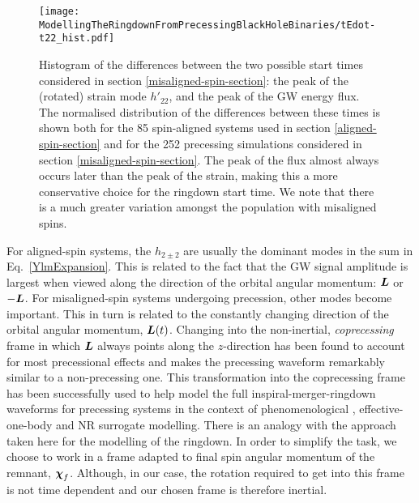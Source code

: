 \begin{figure}[b]
    \centering
    \texttt{[image: ModellingTheRingdownFromPrecessingBlackHoleBinaries/tEdot-t22\_hist.pdf]}
    \caption[Differences between the times of peak strain and peak GW energy flux]{  
    Histogram of the differences between the two possible start times considered in section \ref{misaligned-spin-section}: the peak of the (rotated) strain mode $h'_{22}$, and the peak of the GW energy flux.
    The normalised distribution of the differences between these times is shown both for the 85 spin-aligned systems used in section \ref{aligned-spin-section} and for the 252 precessing simulations considered in section \ref{misaligned-spin-section}. 
    The peak of the flux almost always occurs later than the peak of the strain, making this a more conservative choice for the ringdown start time. 
    We note that there is a much greater variation amongst the population with misaligned spins.
    }
	\label{tEdot-t22}
\end{figure}

For aligned-spin systems, the $h_{2\pm2}$ are usually the dominant modes in the sum in Eq.~\ref{YlmExpansion}. This is related to the fact that the GW signal amplitude is largest when viewed along the direction of the orbital angular momentum: $\vb*{L}$ or $-\vb*{L}$. For misaligned-spin systems undergoing precession, other modes become important. This in turn is related to the constantly changing direction of the orbital angular momentum, $\vb*{L}(t)$.
Changing into the non-inertial, \emph{coprecessing} frame in which $\vb*{L}$ always points along the $z$-direction has been found to account for most precessional effects and makes the precessing waveform remarkably similar to a non-precessing one.
This transformation into the coprecessing frame has been successfully used to help model the full inspiral-merger-ringdown waveforms for precessing systems \cite{Schmidt:2010it,Schmidt:2012rh} in the context of phenomenological \cite{Hannam:2013oca, Khan:2018fmp, Pratten:2020ceb}, effective-one-body \cite{Pan:2013rra, Ossokine:2020kjp} and NR surrogate \cite{Blackman:2017dfb, Blackman:2017pcm, Varma:2019csw} modelling.
There is an analogy with the approach taken here for the modelling of the ringdown. In order to simplify the task, we choose to work in a frame adapted to final spin angular momentum of the remnant, $\vb*{\chi}_f$.
Although, in our case, the rotation required to get into this frame is not time dependent and our chosen frame is therefore inertial.

